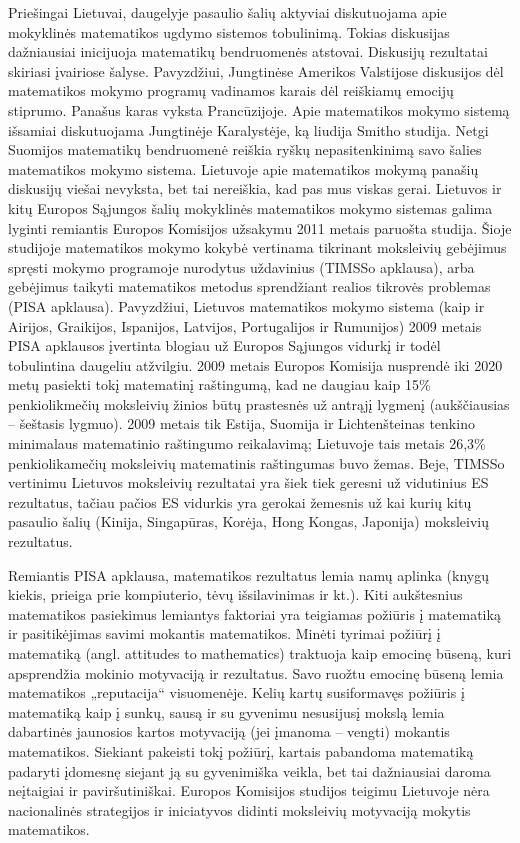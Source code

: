 \documentclass{article}
\begin{document}
Priešingai Lietuvai, daugelyje pasaulio šalių aktyviai diskutuojama apie mokyklinės matematikos ugdymo sistemos tobulinimą.  Tokias diskusijas dažniausiai inicijuoja matematikų bendruomenės atstovai.  Diskusijų rezultatai skiriasi įvairiose šalyse. Pavyzdžiui, Jungtinėse Amerikos Valstijose diskusijos dėl matematikos mokymo programų vadinamos karais dėl reiškiamų emocijų stiprumo. Panašus karas vyksta Prancūzijoje. Apie matematikos mokymo sistemą išsamiai diskutuojama Jungtinėje Karalystėje, ką liudija Smitho studija. Netgi Suomijos matematikų bendruomenė reiškia ryškų nepasitenkinimą savo šalies matematikos mokymo sistema. Lietuvoje apie matematikos mokymą panašių diskusijų viešai nevyksta, bet tai nereiškia, kad pas mus viskas gerai.  Lietuvos ir kitų Europos Sąjungos šalių mokyklinės matematikos mokymo sistemas galima lyginti remiantis Europos Komisijos užsakymu 2011 metais paruošta studija.  Šioje studijoje matematikos mokymo kokybė vertinama tikrinant moksleivių gebėjimus spręsti mokymo programoje nurodytus uždavinius (TIMSSo apklausa), arba gebėjimus taikyti matematikos metodus sprendžiant realios tikrovės problemas (PISA apklausa). Pavyzdžiui, Lietuvos matematikos mokymo sistema (kaip ir Airijos, Graikijos, Ispanijos, Latvijos, Portugalijos ir Rumunijos) 2009 metais PISA apklausos įvertinta blogiau už Europos Sąjungos vidurkį ir todėl tobulintina daugeliu atžvilgiu.  2009 metais Europos Komisija nusprendė iki 2020 metų pasiekti tokį matematinį raštingumą, kad ne daugiau kaip 15\% penkiolikmečių moksleivių žinios būtų prastesnės už antrąjį lygmenį (aukščiausias – šeštasis lygmuo).  2009 metais tik Estija, Suomija ir Lichtenšteinas tenkino minimalaus matematinio raštingumo reikalavimą; Lietuvoje tais metais 26,3\% penkiolikamečių moksleivių matematinis raštingumas buvo žemas. Beje, TIMSSo vertinimu Lietuvos moksleivių rezultatai yra šiek tiek geresni už vidutinius ES rezultatus, tačiau pačios ES vidurkis yra gerokai žemesnis už kai kurių kitų pasaulio šalių (Kinija, Singapūras, Korėja, Hong Kongas, Japonija) moksleivių rezultatus.

Remiantis PISA apklausa, matematikos rezultatus lemia namų aplinka (knygų kiekis, prieiga prie kompiuterio, tėvų išsilavinimas ir kt.).  Kiti aukštesnius matematikos pasiekimus lemiantys faktoriai yra teigiamas požiūris į matematiką
ir pasitikėjimas savimi mokantis matematikos. Minėti tyrimai požiūrį į matematiką (angl. attitudes to mathematics) traktuoja kaip emocinę būseną, kuri apsprendžia mokinio motyvaciją ir rezultatus. Savo ruožtu emocinę būseną lemia matematikos „reputacija“ visuomenėje. Kelių kartų susiformavęs požiūris į matematiką kaip į sunkų, sausą ir su gyvenimu nesusijusį mokslą lemia dabartinės jaunosios kartos motyvaciją (jei įmanoma – vengti) mokantis matematikos.  Siekiant pakeisti tokį požiūrį, kartais pabandoma matematiką padaryti įdomesnę siejant ją su gyvenimiška veikla, bet tai dažniausiai daroma neįtaigiai ir paviršutiniškai. Europos Komisijos studijos teigimu Lietuvoje nėra nacionalinės strategijos ir iniciatyvos didinti moksleivių motyvaciją mokytis matematikos.
\end{document}
